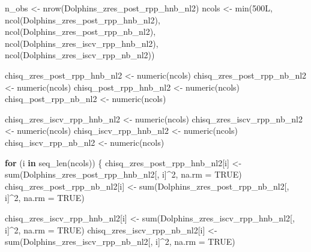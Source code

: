 \documentclass[
  english,
  letterpaper,
  DIV=11,
  numbers=noendperiod]{scrartcl}
\newenvironment{Shaded}{\begin{snugshade}}{\end{snugshade}}
\newcommand{\AttributeTok}[1]{\textcolor[rgb]{0.40,0.45,0.13}{#1}}
\newcommand{\ConstantTok}[1]{\textcolor[rgb]{0.56,0.35,0.01}{#1}}
\newcommand{\ControlFlowTok}[1]{\textcolor[rgb]{0.00,0.23,0.31}{\textbf{#1}}}
\newcommand{\DecValTok}[1]{\textcolor[rgb]{0.68,0.00,0.00}{#1}}
\newcommand{\FunctionTok}[1]{\textcolor[rgb]{0.28,0.35,0.67}{#1}}
\newcommand{\NormalTok}[1]{\textcolor[rgb]{0.00,0.23,0.31}{#1}}
\newcommand{\OtherTok}[1]{\textcolor[rgb]{0.00,0.23,0.31}{#1}}
\newcommand{\SpecialCharTok}[1]{\textcolor[rgb]{0.37,0.37,0.37}{#1}}
\begin{document}
\begin{Shaded}
\begin{Highlighting}[]
\NormalTok{n\_obs  }\OtherTok{\textless{}{-}} \FunctionTok{nrow}\NormalTok{(Dolphins\_zres\_post\_rpp\_hnb\_nl2)}
\NormalTok{ncols  }\OtherTok{\textless{}{-}} \FunctionTok{min}\NormalTok{(}\DecValTok{500}\NormalTok{L, }\FunctionTok{ncol}\NormalTok{(Dolphins\_zres\_post\_rpp\_hnb\_nl2), }\FunctionTok{ncol}\NormalTok{(Dolphins\_zres\_post\_rpp\_nb\_nl2),}
              \FunctionTok{ncol}\NormalTok{(Dolphins\_zres\_iscv\_rpp\_hnb\_nl2), }\FunctionTok{ncol}\NormalTok{(Dolphins\_zres\_iscv\_rpp\_nb\_nl2))}

\NormalTok{chisq\_zres\_post\_rpp\_hnb\_nl2 }\OtherTok{\textless{}{-}} \FunctionTok{numeric}\NormalTok{(ncols)}
\NormalTok{chisq\_zres\_post\_rpp\_nb\_nl2  }\OtherTok{\textless{}{-}} \FunctionTok{numeric}\NormalTok{(ncols)}
\NormalTok{chisq\_post\_rpp\_hnb\_nl2      }\OtherTok{\textless{}{-}} \FunctionTok{numeric}\NormalTok{(ncols)}
\NormalTok{chisq\_post\_rpp\_nb\_nl2       }\OtherTok{\textless{}{-}} \FunctionTok{numeric}\NormalTok{(ncols)}

\NormalTok{chisq\_zres\_iscv\_rpp\_hnb\_nl2 }\OtherTok{\textless{}{-}} \FunctionTok{numeric}\NormalTok{(ncols)}
\NormalTok{chisq\_zres\_iscv\_rpp\_nb\_nl2  }\OtherTok{\textless{}{-}} \FunctionTok{numeric}\NormalTok{(ncols)}
\NormalTok{chisq\_iscv\_rpp\_hnb\_nl2      }\OtherTok{\textless{}{-}} \FunctionTok{numeric}\NormalTok{(ncols)}
\NormalTok{chisq\_iscv\_rpp\_nb\_nl2       }\OtherTok{\textless{}{-}} \FunctionTok{numeric}\NormalTok{(ncols)}

\ControlFlowTok{for}\NormalTok{ (i }\ControlFlowTok{in} \FunctionTok{seq\_len}\NormalTok{(ncols)) \{}
\NormalTok{  chisq\_zres\_post\_rpp\_hnb\_nl2[i] }\OtherTok{\textless{}{-}} \FunctionTok{sum}\NormalTok{(Dolphins\_zres\_post\_rpp\_hnb\_nl2[, i]}\SpecialCharTok{\^{}}\DecValTok{2}\NormalTok{, }\AttributeTok{na.rm =} \ConstantTok{TRUE}\NormalTok{)}
\NormalTok{  chisq\_zres\_post\_rpp\_nb\_nl2[i]  }\OtherTok{\textless{}{-}} \FunctionTok{sum}\NormalTok{(Dolphins\_zres\_post\_rpp\_nb\_nl2[,  i]}\SpecialCharTok{\^{}}\DecValTok{2}\NormalTok{, }\AttributeTok{na.rm =} \ConstantTok{TRUE}\NormalTok{)}
  
\NormalTok{  chisq\_zres\_iscv\_rpp\_hnb\_nl2[i] }\OtherTok{\textless{}{-}} \FunctionTok{sum}\NormalTok{(Dolphins\_zres\_iscv\_rpp\_hnb\_nl2[, i]}\SpecialCharTok{\^{}}\DecValTok{2}\NormalTok{, }\AttributeTok{na.rm =} \ConstantTok{TRUE}\NormalTok{)}
\NormalTok{  chisq\_zres\_iscv\_rpp\_nb\_nl2[i]  }\OtherTok{\textless{}{-}} \FunctionTok{sum}\NormalTok{(Dolphins\_zres\_iscv\_rpp\_nb\_nl2[,  i]}\SpecialCharTok{\^{}}\DecValTok{2}\NormalTok{, }\AttributeTok{na.rm =} \ConstantTok{TRUE}\NormalTok{)}
  

\end{Highlighting}
\end{Shaded}
\end{document}
